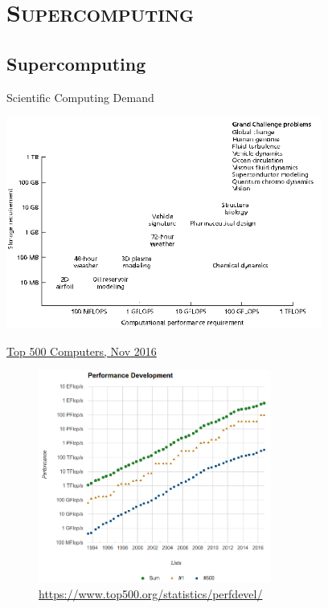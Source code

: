 \documentclass[xcolor=x11names,compress]{beamer}
\renewcommand{\(}{\begin{columns}}
\renewcommand{\)}{\end{columns}}
\newcommand{\<}[1]{\begin{column}{#1}}
\renewcommand{\>}{\end{column}}
\begin{document}
\section{\scshape Supercomputing}
\subsection{Supercomputing}
\begin{frame}{Scientific Computing Demand}

\begin{center}
\includegraphics[height=2.75in,clip]{../figs/MemoryNeeds}
\end{center}

\end{frame}

\begin{frame}{\href{https://www.top500.org/statistics/perfdevel/}{Top 500 Computers, Nov 2016}}

\begin{center}
\begin{figure}
\includegraphics[height=2.75in]{../figs/Supercomputers-history-2016}
\caption{\url{https://www.top500.org/statistics/perfdevel/}}
\end{figure}
\end{center}

\end{frame}
\end{document}
